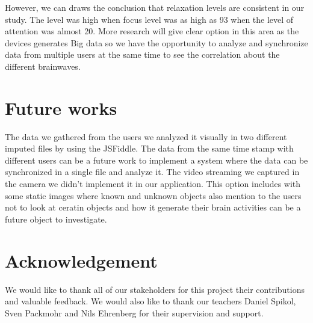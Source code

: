 \documentclass{bioinfo}
\begin{document}
However, we can draws the conclusion that relaxation levels are consistent in our study. The level was high when focus level was as high as 93 when the level of attention was almost 20. More research will give clear option in this area as the devices generates Big data so we have the opportunity to analyze and synchronize data from multiple users at the same time to see the correlation about the different brainwaves.

\section{Future works}
The data we gathered from the users we analyzed it visually in two different imputed files by using the JSFiddle. The data from the same time stamp with different users can be a future work to implement a system where the data can be synchronized in a single file and analyze it. The video streaming we captured in the camera we didn't implement it in our application. This option includes with some static images where known and unknown objects also mention to the users not to look at ceratin objects and how it generate their brain activities can be a future object to investigate.

\section*{Acknowledgement}
We would like to thank all of our stakeholders for this project their contributions and valuable feedback. We would also like to thank our teachers Daniel Spikol, Sven Packmohr and Nils Ehrenberg for their supervision and support.
\end{document}
